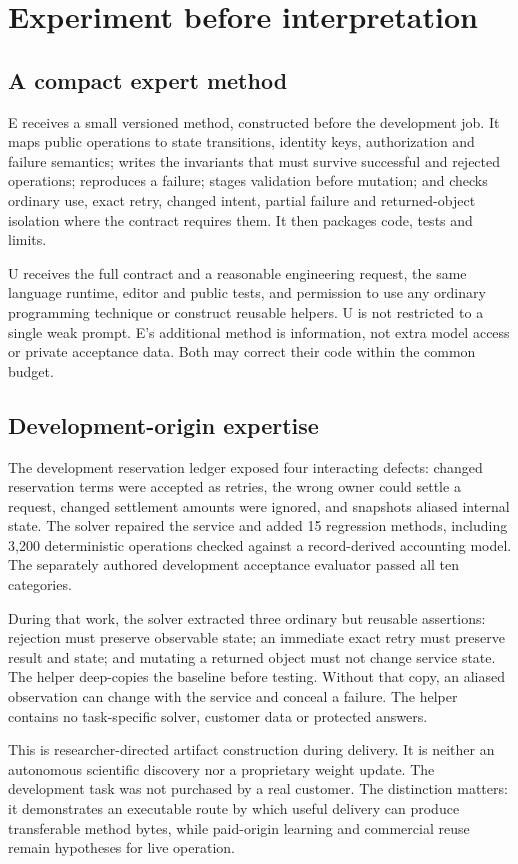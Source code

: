 \documentclass[11pt,letterpaper]{article}
\begin{document}
\section{Experiment before interpretation}
\subsection{A compact expert method}
E receives a small versioned method, constructed before the development job. It maps public operations to state transitions, identity keys, authorization and failure semantics; writes the invariants that must survive successful and rejected operations; reproduces a failure; stages validation before mutation; and checks ordinary use, exact retry, changed intent, partial failure and returned-object isolation where the contract requires them. It then packages code, tests and limits.

U receives the full contract and a reasonable engineering request, the same language runtime, editor and public tests, and permission to use any ordinary programming technique or construct reusable helpers. U is not restricted to a single weak prompt. E's additional method is information, not extra model access or private acceptance data. Both may correct their code within the common budget.

\subsection{Development-origin expertise}
The development reservation ledger exposed four interacting defects: changed reservation terms were accepted as retries, the wrong owner could settle a request, changed settlement amounts were ignored, and snapshots aliased internal state. The solver repaired the service and added 15 regression methods, including 3,200 deterministic operations checked against a record-derived accounting model. The separately authored development acceptance evaluator passed all ten categories.

During that work, the solver extracted three ordinary but reusable assertions: rejection must preserve observable state; an immediate exact retry must preserve result and state; and mutating a returned object must not change service state. The helper deep-copies the baseline before testing. Without that copy, an aliased observation can change with the service and conceal a failure. The helper contains no task-specific solver, customer data or protected answers.

This is researcher-directed artifact construction during delivery. It is neither an autonomous scientific discovery nor a proprietary weight update. The development task was not purchased by a real customer. The distinction matters: it demonstrates an executable route by which useful delivery can produce transferable method bytes, while paid-origin learning and commercial reuse remain hypotheses for live operation.
\end{document}
